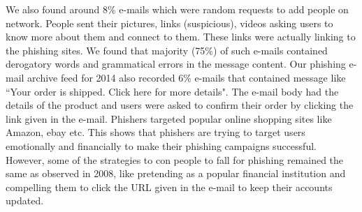 \documentclass[conference]{IEEEtran}
\begin{document}
\newline \indent
We also found around 8\% e-mails which were random requests to add people on network. People sent their pictures, links (suspicious), videos asking users to know more about them and connect to them. These links were actually linking to the phishing sites. We found that majority (75\%) of such e-mails contained derogatory words and grammatical errors in the message content. Our phishing e-mail archive feed for 2014 also recorded 6\% e-mails that contained message like ``Your order is shipped. Click here for more details". The e-mail body had the details of the product and users were asked to confirm their order by clicking the link given in the e-mail. Phishers targeted popular online shopping sites like Amazon, ebay etc.
\newline \indent
This shows that phishers are trying to target users emotionally and financially to make their phishing campaigns successful. However, some of the strategies to con people to fall for phishing remained the same as observed in 2008, like pretending as a popular financial institution and compelling them to click the URL given in the e-mail to keep their accounts updated.
\end{document}
